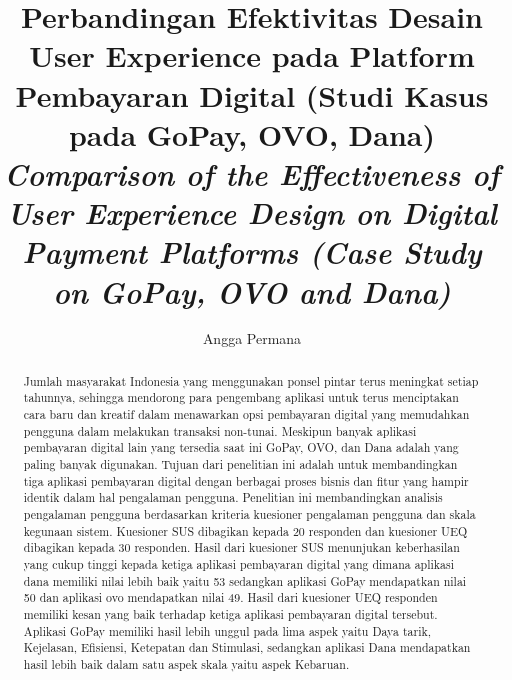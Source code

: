 \documentclass[
 manuscript=article,  %
  layout=publish, 
  year=2024, 
  month= Februari, %
  volume=8,
  number=1 
]{JIKO}
\title{%
	Perbandingan Efektivitas Desain User Experience pada Platform Pembayaran Digital (Studi Kasus pada GoPay, OVO, Dana)\\
	\itshape Comparison of the Effectiveness of User Experience Design on Digital Payment Platforms (Case Study on GoPay, OVO and Dana)\\
}
\author{Angga Permana}
\affiliation{Informatika, Fakultas Ilmu Komputer, Universitas Singaperbangsa Karawang, Jawa Barat, Indonesia}
\begin{document}

 
\begin{abstract}
\noindent\hspace{0.6cm}  Jumlah masyarakat Indonesia yang menggunakan ponsel pintar terus meningkat setiap tahunnya, sehingga mendorong para pengembang aplikasi untuk terus menciptakan cara baru dan kreatif dalam menawarkan opsi pembayaran digital yang memudahkan pengguna dalam melakukan transaksi non-tunai.  Meskipun banyak aplikasi pembayaran digital lain yang tersedia saat ini GoPay, OVO, dan Dana adalah yang paling banyak digunakan. Tujuan dari penelitian ini adalah untuk membandingkan tiga aplikasi pembayaran digital dengan berbagai proses bisnis dan fitur yang hampir identik dalam hal pengalaman pengguna. Penelitian ini membandingkan analisis pengalaman pengguna berdasarkan kriteria kuesioner pengalaman pengguna dan skala kegunaan sistem. Kuesioner SUS dibagikan kepada 20 responden dan kuesioner UEQ dibagikan kepada 30 responden. Hasil dari kuesioner SUS menunjukan keberhasilan yang cukup tinggi kepada ketiga aplikasi pembayaran digital yang dimana aplikasi dana memiliki nilai lebih baik yaitu 53 sedangkan aplikasi GoPay mendapatkan nilai 50 dan aplikasi ovo mendapatkan nilai 49. Hasil dari kuesioner UEQ responden memiliki kesan yang baik terhadap ketiga aplikasi pembayaran digital tersebut. Aplikasi GoPay memiliki hasil lebih unggul pada lima aspek yaitu Daya tarik, Kejelasan, Efisiensi, Ketepatan dan Stimulasi, sedangkan aplikasi Dana mendapatkan hasil lebih baik dalam satu aspek skala yaitu aspek Kebaruan.
\end{abstract}
\end{document}
